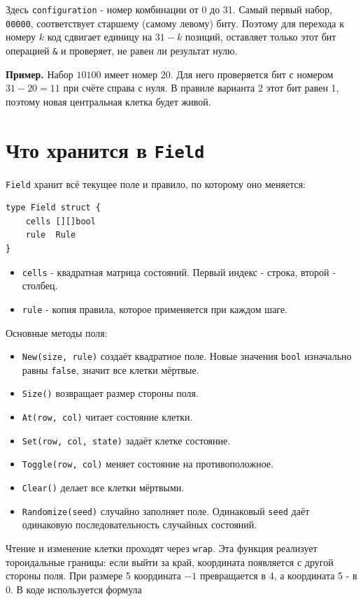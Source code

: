 \documentclass[12pt,a4paper]{article}
\newcommand{\code}[1]{\texttt{#1}}
\newcommand{\sectiontitle}[1]{\section{\color{ink}#1}}
\begin{document}
Здесь \code{configuration} - номер комбинации от 0 до 31. Самый первый
набор, \code{00000}, соответствует старшему (самому левому) биту. Поэтому
для перехода к номеру $k$ код сдвигает единицу на $31-k$ позиций, оставляет
только этот бит операцией \code{\&} и проверяет, не равен ли результат нулю.

\noindent\colorbox{softyellow}{\parbox{\dimexpr\linewidth-2\fboxsep}{
  \textbf{Пример.} Набор $10100$ имеет номер 20. Для него проверяется бит
  с номером $31-20=11$ при счёте справа с нуля. В правиле варианта 2 этот
  бит равен 1, поэтому новая центральная клетка будет живой.
}}

\sectiontitle{Что хранится в \code{Field}}

\code{Field} хранит всё текущее поле и правило, по которому оно меняется:

\begin{lstlisting}[style=gostyle]
type Field struct {
    cells [][]bool
    rule  Rule
}
\end{lstlisting}

\begin{itemize}
  \item \code{cells} - квадратная матрица состояний. Первый индекс -
        строка, второй - столбец.
  \item \code{rule} - копия правила, которое применяется при каждом шаге.
\end{itemize}

Основные методы поля:

\begin{itemize}
  \item \code{New(size, rule)} создаёт квадратное поле. Новые значения
        \code{bool} изначально равны \code{false}, значит все клетки мёртвые.
  \item \code{Size()} возвращает размер стороны поля.
  \item \code{At(row, col)} читает состояние клетки.
  \item \code{Set(row, col, state)} задаёт клетке состояние.
  \item \code{Toggle(row, col)} меняет состояние на противоположное.
  \item \code{Clear()} делает все клетки мёртвыми.
  \item \code{Randomize(seed)} случайно заполняет поле. Одинаковый \code{seed}
        даёт одинаковую последовательность случайных состояний.
\end{itemize}

Чтение и изменение клетки проходят через \code{wrap}. Эта функция реализует
тороидальные границы: если выйти за край, координата появляется с другой
стороны поля. При размере 5 координата $-1$ превращается в 4, а координата
5 - в 0. В коде используется формула
\end{document}
